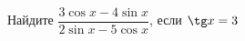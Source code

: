 \begin{ex}
	\begin{condition}
		Найдите \( \dfrac{3\cos x - 4\sin x}{2\sin x - 5\cos x} \), если \( \tg x = 3 \)
	\end{condition}
\end{ex}